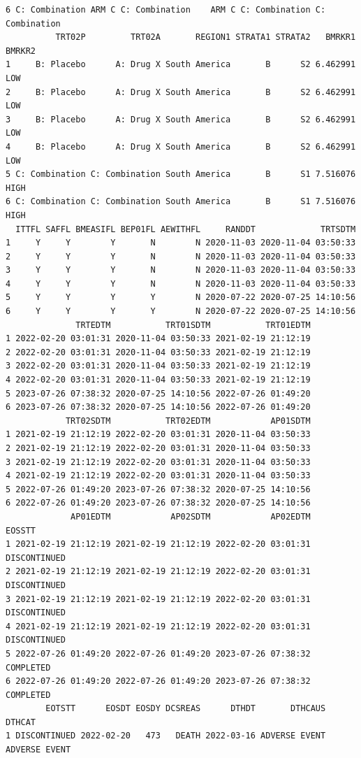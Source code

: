 \documentclass[
  letterpaper,
  DIV=11,
  numbers=noendperiod]{scrreprt}
\begin{document}
\begin{verbatim}
6 C: Combination ARM C C: Combination    ARM C C: Combination C: Combination
          TRT02P         TRT02A       REGION1 STRATA1 STRATA2   BMRKR1 BMRKR2
1     B: Placebo      A: Drug X South America       B      S2 6.462991    LOW
2     B: Placebo      A: Drug X South America       B      S2 6.462991    LOW
3     B: Placebo      A: Drug X South America       B      S2 6.462991    LOW
4     B: Placebo      A: Drug X South America       B      S2 6.462991    LOW
5 C: Combination C: Combination South America       B      S1 7.516076   HIGH
6 C: Combination C: Combination South America       B      S1 7.516076   HIGH
  ITTFL SAFFL BMEASIFL BEP01FL AEWITHFL     RANDDT             TRTSDTM
1     Y     Y        Y       N        N 2020-11-03 2020-11-04 03:50:33
2     Y     Y        Y       N        N 2020-11-03 2020-11-04 03:50:33
3     Y     Y        Y       N        N 2020-11-03 2020-11-04 03:50:33
4     Y     Y        Y       N        N 2020-11-03 2020-11-04 03:50:33
5     Y     Y        Y       Y        N 2020-07-22 2020-07-25 14:10:56
6     Y     Y        Y       Y        N 2020-07-22 2020-07-25 14:10:56
              TRTEDTM           TRT01SDTM           TRT01EDTM
1 2022-02-20 03:01:31 2020-11-04 03:50:33 2021-02-19 21:12:19
2 2022-02-20 03:01:31 2020-11-04 03:50:33 2021-02-19 21:12:19
3 2022-02-20 03:01:31 2020-11-04 03:50:33 2021-02-19 21:12:19
4 2022-02-20 03:01:31 2020-11-04 03:50:33 2021-02-19 21:12:19
5 2023-07-26 07:38:32 2020-07-25 14:10:56 2022-07-26 01:49:20
6 2023-07-26 07:38:32 2020-07-25 14:10:56 2022-07-26 01:49:20
            TRT02SDTM           TRT02EDTM            AP01SDTM
1 2021-02-19 21:12:19 2022-02-20 03:01:31 2020-11-04 03:50:33
2 2021-02-19 21:12:19 2022-02-20 03:01:31 2020-11-04 03:50:33
3 2021-02-19 21:12:19 2022-02-20 03:01:31 2020-11-04 03:50:33
4 2021-02-19 21:12:19 2022-02-20 03:01:31 2020-11-04 03:50:33
5 2022-07-26 01:49:20 2023-07-26 07:38:32 2020-07-25 14:10:56
6 2022-07-26 01:49:20 2023-07-26 07:38:32 2020-07-25 14:10:56
             AP01EDTM            AP02SDTM            AP02EDTM       EOSSTT
1 2021-02-19 21:12:19 2021-02-19 21:12:19 2022-02-20 03:01:31 DISCONTINUED
2 2021-02-19 21:12:19 2021-02-19 21:12:19 2022-02-20 03:01:31 DISCONTINUED
3 2021-02-19 21:12:19 2021-02-19 21:12:19 2022-02-20 03:01:31 DISCONTINUED
4 2021-02-19 21:12:19 2021-02-19 21:12:19 2022-02-20 03:01:31 DISCONTINUED
5 2022-07-26 01:49:20 2022-07-26 01:49:20 2023-07-26 07:38:32    COMPLETED
6 2022-07-26 01:49:20 2022-07-26 01:49:20 2023-07-26 07:38:32    COMPLETED
        EOTSTT      EOSDT EOSDY DCSREAS      DTHDT       DTHCAUS        DTHCAT
1 DISCONTINUED 2022-02-20   473   DEATH 2022-03-16 ADVERSE EVENT ADVERSE EVENT

\end{verbatim}
\end{document}
